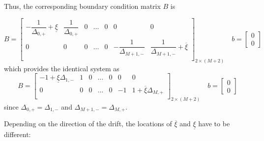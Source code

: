 \documentclass[11pt]{article}
\theoremstyle{definition}
\begin{document}
Thus, the corresponding boundary condition matrix $B$ is

\begin{equation}\label{eq:mixed-barrier-matrix-original}
B = \begin{bmatrix}
-\dfrac{1}{\Delta_{0,+}} + \underline{\xi} & \dfrac{1}{\Delta_{0,+}} & 0 & \dots & 0 & 0 & 0 \\
0 & 0 & 0 & \dots & 0 & -\dfrac{1}{\Delta_{M+1,-}} & \dfrac{1}{\Delta_{M+1,-}} + \overline{\xi}\\
\end{bmatrix}_{2 \times (M+2)} \quad
b = \begin{bmatrix}
0 \\
0
\end{bmatrix}
\end{equation}
which provides the identical system as
\begin{equation}\label{eq:mixed-barrier-matrix}
B = \begin{bmatrix}
-1 +  \underline{\xi} \Delta_{1,-} & 1 & 0 & \dots & 0 & 0 & 0 \\
0 & 0 & 0 & \dots & 0 & -1 & 1 + \overline{\xi} \Delta_{M,+}\\
\end{bmatrix}_{2 \times (M+2)} \quad
b = \begin{bmatrix}
0 \\
0
\end{bmatrix}
\end{equation}
since $\Delta_{0,+} = \Delta_{1,-}$ and $\Delta_{M+1,-} = \Delta_{M,+}$.


Depending on the direction of the drift, the locations of $\overline{\xi}$ and $\underline{\xi}$ have to be different:
\end{document}
